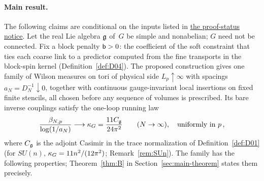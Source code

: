 \paragraph{Main result.}
The following claims are conditional on the inputs listed in \hyperref[par:proof-status]{the proof-status notice}.
Let the real Lie algebra $\mathfrak{g}$ of~$G$ be simple and nonabelian; $G$ need not be connected. Fix a block penalty $\mathsf{b}>0$: the coefficient of the soft constraint that ties each coarse link to a predictor computed from the fine transports in the block-spin kernel (Definition~\ref{def:D04}). The proposed construction gives one family of Wilson measures on tori of physical side $L_p\uparrow\infty$ with spacings $a_N=D_N^{-1}\downarrow0$, together with continuous gauge-invariant local insertions on fixed finite stencils, all chosen before any sequence of volumes is prescribed. Its bare inverse couplings satisfy the one-loop running law
\begin{equation}\label{eq:intro-running}
\frac{\beta_{N,p}}{\log(1/a_N)}\longrightarrow\kappa_G=\frac{11C_{\mathfrak{g}}}{24\pi^2}
\qquad(N\to\infty),\quad\text{uniformly in }p\,,
\end{equation}%
where $C_{\mathfrak{g}}$ is the adjoint Casimir in the trace normalization of Definition~\ref{def:D01} (for $SU(n)$, $\kappa_G=11n^2/(12\pi^2)$; Remark~\ref{rem:SUn}). The family has the following properties; Theorem~\ref{thm:B} in Section~\ref{sec:main-theorem} states them precisely.

